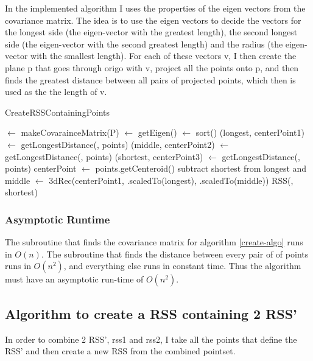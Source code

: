 In the implemented algorithm I uses the properties of the eigen vectors from the covariance matrix. The idea is to use the eigen vectors to decide the vectors for the longest side (the eigen-vector with the greatest length), the second longest side (the eigen-vector with the second greatest length) and the radius (the eigen-vector with the smallest length). For each of these vectors v, I then create the plane p that goes through origo with v, project all the points onto p, and then finds the greatest distance between all pairs of projected points, which then is used as the the length of v.
\begin{algorithm}[H]
  \caption{CreateRSSContainingPoints}
  \label{create-algo}
   
  \dontprintsemicolon
  \covar $\gets$ makeCovarainceMatrix(P)\;
  \eigen $\gets$ getEigen(\covar) \;
  \eigen $\gets$ sort(\eigen) \;
  (longest, centerPoint1) $\gets$ getLongestDistance(\eigen[2], points) \;
  (middle, centerPoint2) $\gets$ getLongestDistance(\eigen[1], points) \;
  (shortest, centerPoint3) $\gets$ getLongestDistance(\eigen[0], points) \;
  centerPoint $\gets$ points.getCenteroid() \;
  subtract shortest from longest and middle
  \threedeeRec $\gets$ 3dRec(centerPoint1, \eigen[2].scaledTo(longest), \eigen[1].scaledTo(middle)) \;
  \return RSS(\threedeeRec, shortest) \;
\end{algorithm}

\subsubsection{Asymptotic Runtime}
The subroutine that finds the covariance matrix for algorithm \ref{create-algo} runs in $O(n)$. The subroutine that finds the distance between every pair of of points runs in $O(n^2)$, and everything else runs in constant time. Thus the algorithm must have an asymptotic run-time of $O(n^2)$.

\subsection{Algorithm to create a RSS containing 2 RSS'}
In order to combine  2 RSS', rss1 and rss2, I take all the points that define the RSS' and then create a new RSS from the combined pointset. 

